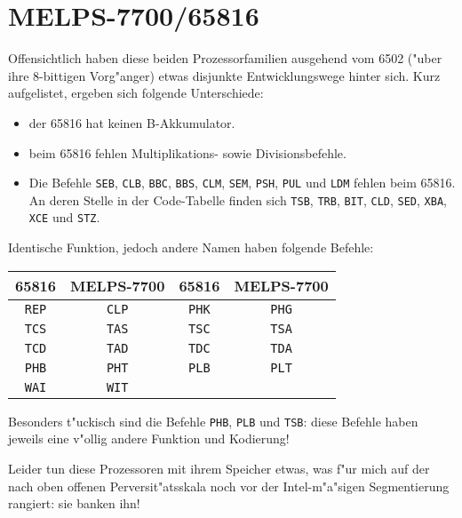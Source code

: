 \documentclass[12pt,a4paper,twoside]{report}
\newcommand{\tty}[1]{{\tt #1}}
\begin{document}

\section{MELPS-7700/65816}
\label{MELPS7700Spec}

Offensichtlich haben diese beiden Prozessorfamilien ausgehend vom
6502 ("uber ihre 8-bittigen Vorg"anger) etwas disjunkte Entwicklungswege
hinter sich.  Kurz aufgelistet, ergeben sich folgende Unterschiede:
\begin{itemize}
\item{der 65816 hat keinen B-Akkumulator.}
\item{beim 65816 fehlen Multiplikations- sowie Divisionsbefehle.}
\item{Die Befehle \tty{SEB}, \tty{CLB}, \tty{BBC}, \tty{BBS},
      \tty{CLM}, \tty{SEM}, \tty{PSH}, \tty{PUL} und \tty{LDM}
      fehlen beim 65816.  An deren Stelle in der Code-Tabelle finden
      sich \tty{TSB}, \tty{TRB}, \tty{BIT}, \tty{CLD}, \tty{SED},
      \tty{XBA}, \tty{XCE} und \tty{STZ}.}
\end{itemize}
Identische Funktion, jedoch andere Namen haben folgende Befehle:
\par
\begin{center}\begin{tabular}{|c|c||c|c|}
\hline
   65816  &  MELPS-7700 & 65816 & MELPS-7700 \\
\hline
\hline
    \tty{REP}   &    \tty{CLP}      & \tty{PHK}   &   \tty{PHG} \\
    \tty{TCS}   &    \tty{TAS}      & \tty{TSC}   &   \tty{TSA} \\
    \tty{TCD}   &    \tty{TAD}      & \tty{TDC}   &   \tty{TDA} \\
    \tty{PHB}   &    \tty{PHT}      & \tty{PLB}   &   \tty{PLT} \\
    \tty{WAI}   &    \tty{WIT}      &       &       \\
\hline
\end{tabular}\end{center}
\par
Besonders t"uckisch sind die Befehle \tty{PHB}, \tty{PLB} und \tty{TSB}:
diese Befehle haben jeweils eine v"ollig andere Funktion und Kodierung!
\par
Leider tun diese Prozessoren mit ihrem Speicher etwas, was f"ur mich
auf der nach oben offenen Perversit"atsskala noch vor der
Intel-m"a"sigen Segmentierung rangiert: sie banken ihn!
\end{document}
